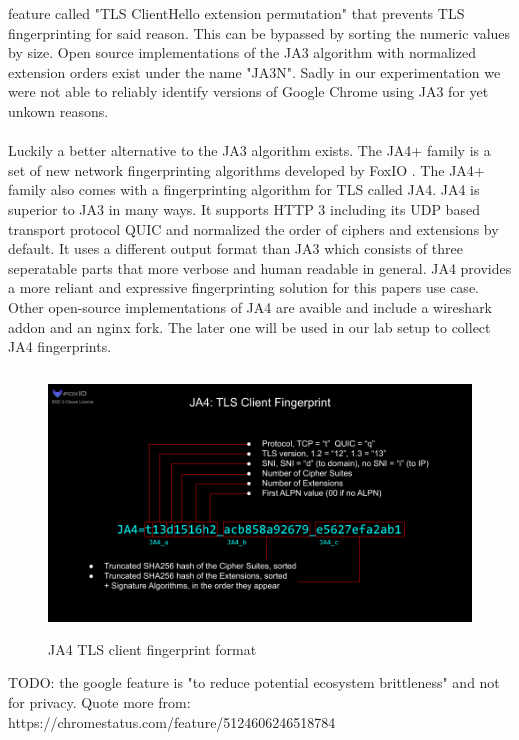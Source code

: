 \documentclass[12pt]{scrbook}
\begin{document}
    feature called "TLS ClientHello extension permutation" that prevents TLS
    fingerprinting for said reason. This can be bypassed by sorting the numeric
    values by size. Open source implementations of the JA3 algorithm with
    normalized extension orders exist under the name "JA3N". Sadly in our
    experimentation we were not able to reliably identify versions of Google
    Chrome using JA3 for yet unkown reasons.\\ \\ Luckily a better alternative
    to the JA3 algorithm exists. The JA4+ family is a set of new network
    fingerprinting algorithms developed by FoxIO \cite{foxIOJa4}. The JA4+
    family also comes with a fingerprinting algorithm for TLS called JA4. JA4 is
    superior to JA3 in many ways. It supports HTTP 3 including its UDP based
    transport protocol QUIC and normalized the order of ciphers and extensions
    by default. It uses a different output format than JA3 which consists of
    three seperatable parts that more verbose and human readable in general. JA4
    provides a more reliant and expressive fingerprinting solution for this
    papers use case. Other open-source implementations of JA4 are avaible and
    include a wireshark addon and an nginx fork. The later one will be used in
    our lab setup to collect JA4 fingerprints.

    \begin{figure}[!htb] \centering
    \includegraphics[height=7cm]{./images/JA4.png} \caption{JA4 TLS client
  fingerprint format} \end{figure}

  TODO: the google feature is "to reduce potential ecosystem brittleness" and
  not for privacy. Quote more from:
  https://chromestatus.com/feature/5124606246518784
\end{document}
